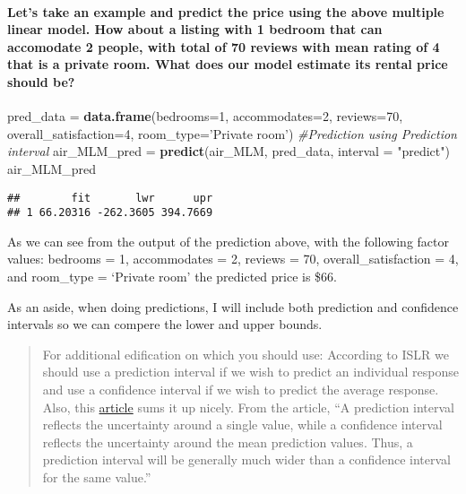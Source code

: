 \documentclass[]{article}
\newenvironment{Shaded}{\begin{snugshade}}{\end{snugshade}}
\newcommand{\CommentTok}[1]{\textcolor[rgb]{0.56,0.35,0.01}{\textit{#1}}}
\newcommand{\DataTypeTok}[1]{\textcolor[rgb]{0.13,0.29,0.53}{#1}}
\newcommand{\DecValTok}[1]{\textcolor[rgb]{0.00,0.00,0.81}{#1}}
\newcommand{\KeywordTok}[1]{\textcolor[rgb]{0.13,0.29,0.53}{\textbf{#1}}}
\newcommand{\NormalTok}[1]{#1}
\newcommand{\StringTok}[1]{\textcolor[rgb]{0.31,0.60,0.02}{#1}}
\let\oldparagraph\paragraph
\renewcommand{\paragraph}[1]{\oldparagraph{#1}\mbox{}}
\begin{document}
\hypertarget{lets-take-an-example-and-predict-the-price-using-the-above-multiple-linear-model.-how-about-a-listing-with-1-bedroom-that-can-accomodate-2-people-with-total-of-70-reviews-with-mean-rating-of-4-that-is-a-private-room.-what-does-our-model-estimate-its-rental-price-should-be}{%
\paragraph{Let's take an example and predict the price using the above
multiple linear model. How about a listing with 1 bedroom that can
accomodate 2 people, with total of 70 reviews with mean rating of 4 that
is a private room. What does our model estimate its rental price should
be?}\label{lets-take-an-example-and-predict-the-price-using-the-above-multiple-linear-model.-how-about-a-listing-with-1-bedroom-that-can-accomodate-2-people-with-total-of-70-reviews-with-mean-rating-of-4-that-is-a-private-room.-what-does-our-model-estimate-its-rental-price-should-be}}

\begin{Shaded}
\begin{Highlighting}[]
\NormalTok{pred_data =}\StringTok{ }\KeywordTok{data.frame}\NormalTok{(}\DataTypeTok{bedrooms=}\DecValTok{1}\NormalTok{, }\DataTypeTok{accommodates=}\DecValTok{2}\NormalTok{, }\DataTypeTok{reviews=}\DecValTok{70}\NormalTok{, }\DataTypeTok{overall_satisfaction=}\DecValTok{4}\NormalTok{, }\DataTypeTok{room_type=}\StringTok{'Private room'}\NormalTok{)}
\CommentTok{#Prediction using Prediction interval}
\NormalTok{air_MLM_pred =}\StringTok{ }\KeywordTok{predict}\NormalTok{(air_MLM, pred_data, }\DataTypeTok{interval =} \StringTok{"predict"}\NormalTok{)}
\NormalTok{air_MLM_pred}
\end{Highlighting}
\end{Shaded}

\begin{verbatim}
##        fit       lwr      upr
## 1 66.20316 -262.3605 394.7669
\end{verbatim}

As we can see from the output of the prediction above, with the
following factor values: bedrooms = 1, accommodates = 2, reviews = 70,
overall\_satisfaction = 4, and room\_type = `Private room' the predicted
price is \$66.

As an aside, when doing predictions, I will include both prediction and
confidence intervals so we can compere the lower and upper bounds.

\begin{quote}
For additional edification on which you should use: According to ISLR we
should use a prediction interval if we wish to predict an individual
response and use a confidence interval if we wish to predict the average
response. Also, this
\href{http://www.sthda.com/english/articles/40-regression-analysis/166-predict-in-r-model-predictions-and-confidence-intervals/}{article}
sums it up nicely. From the article, ``A prediction interval reflects
the uncertainty around a single value, while a confidence interval
reflects the uncertainty around the mean prediction values. Thus, a
prediction interval will be generally much wider than a confidence
interval for the same value.''
\end{quote}
\end{document}
